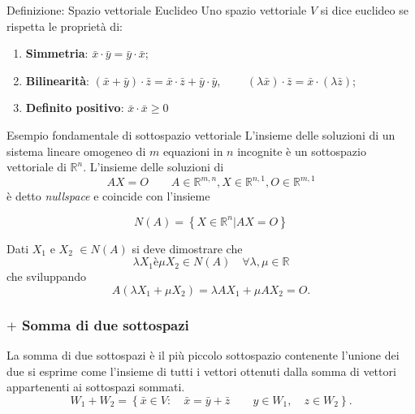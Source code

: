 \documentclass[x11names]{article}
\begin{document}
	\begin{center}
	\colorbox{myblue}{\begin{minipage}{5.75in}
			\begin{blues}{Definizione: Spazio vettoriale Euclideo}
				Uno spazio vettoriale $V$ si dice euclideo se rispetta le proprietà di:
				\begin{enumerate}
					\item \textbf{Simmetria}: $\bar{x} \cdot \bar{y} = \bar{y} \cdot \bar{x}$;
					\item \textbf{Bilinearità}: $\left(\bar{x} + \bar{y}\right) \cdot \bar{z} = \bar{x} \cdot \bar{z} + \bar{y} \cdot \bar{y}$, $\qquad \left(\lambda \bar{x}\right) \cdot \bar{z} = \bar{x} \cdot \left(\lambda \bar{z}\right)$;
					\item \textbf{Definito positivo}: $\bar{x} \cdot \bar{x} \geq 0$
				\end{enumerate}
			\end{blues}
	\end{minipage}}       
\end{center}

\begin{es}{Esempio fondamentale di sottospazio vettoriale}
L'insieme delle soluzioni di un sistema lineare omogeneo di $m$ equazioni in $n$ incognite è un sottospazio vettoriale di $\mathbb{R}^n$. L'insieme delle soluzioni di 
\[
AX = O \qquad A \in \mathbb{R}^{m,n}, X \in \mathbb{R}^{n,1}, O \in \mathbb{R}^{m,1}
\] 
è detto \textit{nullspace} e coincide con l'insieme

\[
N\left(A\right) = \left\{ X \in \mathbb{R}^n | AX = O  \right\}
\]

Dati $X_1$ e $X_2$ $\in N\left(A\right)$ si deve dimostrare che 
\[
\lambda X_1 è \mu X_2 \in N\left(A\right) \quad \forall \lambda,\mu \in \mathbb{R}
\] 
che sviluppando
\[
A\left(\lambda X_1 + \mu X_2\right) = \lambda AX_1 + \mu AX_2 = O
.\] 
\end{es}


\subsubsection{$+$ Somma di due sottospazi}
La somma di due sottospazi è il più piccolo sottospazio contenente l'unione dei due si esprime come l'insieme di tutti i vettori ottenuti dalla somma di vettori appartenenti ai sottospazi sommati.
\[
W_1 + W_2  = \left\{\bar{x} \in V: \quad \bar{x} = \bar{y}+\bar{z}  \qquad y \in W_1, \quad z \in W_2\right\}
.\] 
\end{document}

